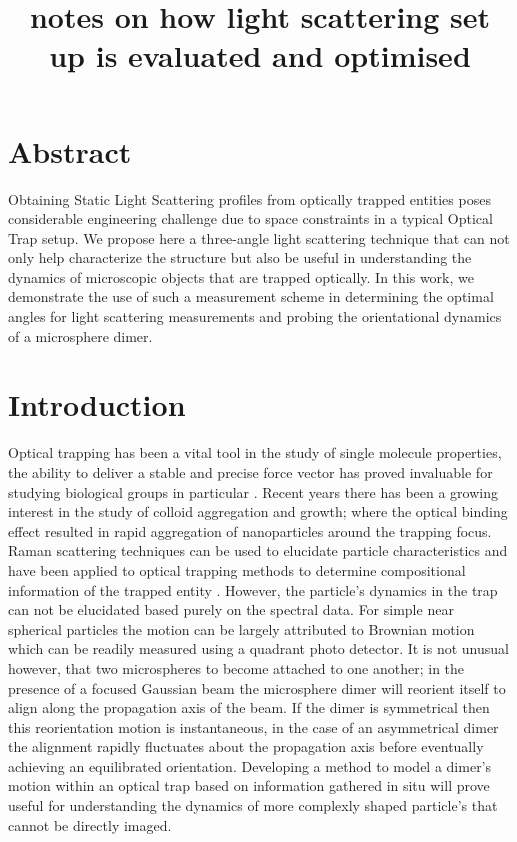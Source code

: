 \documentclass[11pt]{article}
\title{notes on how light scattering set up is evaluated and optimised}
\begin{document}
	
\maketitle

\section*{Abstract}
Obtaining Static Light Scattering profiles from optically trapped entities poses considerable engineering challenge due to space constraints in a typical Optical Trap setup. We propose here a three-angle light scattering technique that can not only help characterize the structure but also be useful in understanding the dynamics of microscopic objects that are trapped optically. In this work, we demonstrate the use of such a measurement scheme in determining the optimal angles for light scattering measurements and probing the orientational dynamics of a microsphere dimer. 

\section*{Introduction}
Optical trapping has been a vital tool in the study of single molecule properties, the ability to deliver a stable and precise force vector has proved invaluable for studying biological groups in particular \cite{2}. Recent years there has been a growing interest in the study of colloid aggregation and growth; where the optical binding effect resulted in rapid aggregation of nanoparticles around the trapping focus. Raman scattering techniques can be used to elucidate particle characteristics and have been applied to optical trapping methods to determine compositional information of the trapped entity \cite{4,7}. However, the particle's dynamics in the trap can not be elucidated based purely on the spectral data. For simple near spherical particles the motion can be largely attributed to Brownian motion which can be readily measured using a quadrant photo detector. It is not unusual however, that two microspheres to become attached to one another; in the presence of a focused Gaussian beam the microsphere dimer will reorient itself to align along the propagation axis of the beam. If the dimer is symmetrical then this reorientation motion is instantaneous, in the case of an asymmetrical dimer the alignment rapidly fluctuates about the propagation axis before eventually achieving an equilibrated orientation. Developing a method to model a dimer's motion within an optical trap based on information gathered in situ will prove useful for understanding the dynamics of more complexly shaped particle's that cannot be directly imaged.
\end{document}
